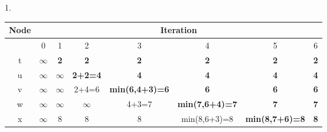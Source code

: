 \documentclass{report}
\begin{document}
\begin{problem}
1.
\begin{table}[ht]
\begin{tabular}{cccccccc}
\hline
Node                   & \multicolumn{7}{c}{Iteration}                                                                                                                                                                                                                                                                                  \\ \hline
\multicolumn{1}{c|}{}  & 0                                 & 1                                 & 2                                       & 3                                            & 4                                               & 5                                            & 6                                            \\ \cline{2-8} 
\multicolumn{1}{c|}{t} & $\infty$                          & {\color[HTML]{FD6864} \textbf{2}} & \textbf{2}                              & \textbf{2}                                   & \textbf{2}                                      & \textbf{2}                                   & \textbf{2}                                   \\
\multicolumn{1}{c|}{u} & $\infty$                          & $\infty$                          & {\color[HTML]{FD6864} \textbf{2+2=4}}   & \textbf{4}                                   & \textbf{4}                                      & \textbf{4}                                   & \textbf{4}                                   \\
\multicolumn{1}{c|}{v} & $\infty$                          & $\infty$                          & 2+4=6                                   & {\color[HTML]{FD6864} \textbf{min(6,4+3)=6}} & \textbf{6}                                      & \textbf{6}                                   & \textbf{6}                                   \\
\multicolumn{1}{c|}{w} & $\infty$                          & $\infty$                          & $\infty$                                & 4+3=7                                        & {\color[HTML]{FD6864} \textbf{min(7,6+4)=7}}    & \textbf{7}                                   & \textbf{7}                                   \\
\multicolumn{1}{c|}{x} & $\infty$                          & 8                                 & 8                                       & 8                                            & min(8,6+3)=8                                    & {\color[HTML]{FD6864} \textbf{min(8,7+6)=8}} & \textbf{8}                                   \\

\end{tabular}
\end{table}
\end{problem}
\end{document}
